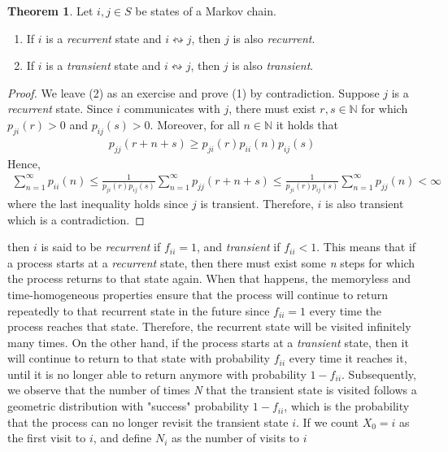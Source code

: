 \documentclass[a4paper,12pt]{article}
\theoremstyle{definition}
\newtheorem{theorem}{Theorem}[subsection]
\newcommand{\N}{\mathbb{N}}
\begin{document}
	\begin{theorem}
		Let $i, j \in S$ be states of a Markov chain.
		\begin{enumerate}
			\item If $i$ is a \emph{recurrent} state and $i \leftrightsquigarrow j$, then $j$ is also \emph{recurrent}.
			\item If $i$ is a \emph{transient} state and $i \leftrightsquigarrow j$, then $j$ is also \emph{transient}.
		\end{enumerate}
	\end{theorem}
	\begin{proof}
		We leave (2) as an exercise and prove (1) by contradiction. Suppose $j$ is a \emph{recurrent} state. Since $i$ communicates with $j$, there must exist $r, s \in \N$ for which $p_{ji}(r) > 0$ and $p_{ij}(s) > 0$.
		Moreover, for all $n \in \N$ it holds that
		\begin{equation*}
		\begin{aligned}
			p_{jj}(r+n+s) \geq p_{ji}(r)p_{ii}(n)p_{ij}(s)
		\end{aligned}
		\end{equation*}		
		Hence,
		\begin{equation*}
			\begin{aligned}
				\sum_{n=1}^{\infty} p_{ii}(n) \leq \frac{1}{p_{ji}(r)p_{ij}(s)} \sum_{n=1}^{\infty} p_{jj}(r+n+s) \leq \frac{1}{p_{ji}(r)p_{ij}(s)} \sum_{n=1}^{\infty} p_{jj}(n) < \infty
			\end{aligned}
			\end{equation*}
		where the last inequality holds since $j$ is transient. Therefore, $i$ is also transient which is a contradiction.
	\end{proof}


	then $i$ is said to be \emph{recurrent} if $f_{ii} = 1$, and \emph{transient} if $f_{ii} < 1$. This means that if a process starts at a \emph{recurrent} state, then there must exist some \emph{n} steps for which the process returns to that state again. When that happens, the memoryless and time-homogeneous properties ensure that the process will continue to return repeatedly to that recurrent state in the future since $f_{ii} = 1$ every time the process reaches that state.  Therefore, the recurrent state will be visited infinitely many times. On the other hand, if the process starts at a \emph{transient} state, then it will continue to return to that state with probability $f_{ii}$ every time it reaches it, until it is no longer able to return anymore with probability $1 - f_{ii}$. Subsequently, we observe that the number of times \emph{N} that the transient state is visited follows a geometric distribution with "success" probability $1 - f_{ii}$, which is the probability that the process can no longer revisit the transient state $i$. If we  count $X_0 = i$ as the first visit to $i$, and define $N_i$ as the number of visits to $i$
	
\end{document}
